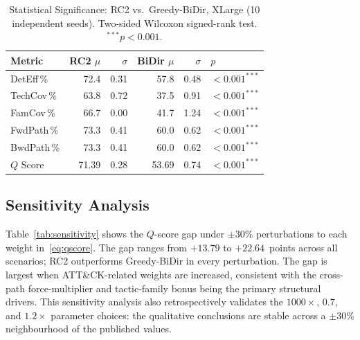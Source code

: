 \documentclass[journal]{IEEEtran}
\newcommand{\qscore}{$Q$-score}
\begin{document}
\begin{table}[t]
\caption{Statistical Significance: RC2 vs.\ Greedy-BiDir, XLarge
  (10 independent seeds). Two-sided Wilcoxon signed-rank test.
  $^{***}p<0.001$.}
\label{tab:stats}
\centering
\renewcommand{\arraystretch}{1.2}
\begin{tabular}{lrrrrl}
\toprule
Metric & RC2 $\mu$ & $\sigma$ & BiDir $\mu$ & $\sigma$ & $p$ \\
\midrule
DetEff\,\%  & 72.4 & 0.31 & 57.8 & 0.48 & $<0.001^{***}$ \\
TechCov\,\% & 63.8 & 0.72 & 37.5 & 0.91 & $<0.001^{***}$ \\
FamCov\,\%  & 66.7 & 0.00 & 41.7 & 1.24 & $<0.001^{***}$ \\
FwdPath\,\% & 73.3 & 0.41 & 60.0 & 0.62 & $<0.001^{***}$ \\
BwdPath\,\% & 73.3 & 0.41 & 60.0 & 0.62 & $<0.001^{***}$ \\
$Q$ Score   & 71.39 & 0.28 & 53.69 & 0.74 & $<0.001^{***}$ \\
\bottomrule
\end{tabular}
\end{table}

\subsection{Sensitivity Analysis}
\label{sec:results:sensitivity}

Table~\ref{tab:sensitivity} shows the \qscore{} gap under $\pm30\%$
perturbations to each weight in~\eqref{eq:qscore}. The gap ranges
from $+13.79$ to $+22.64$~points across all scenarios; RC2
outperforms Greedy-BiDir in every perturbation. The gap is largest
when ATT\&CK-related weights are increased, consistent with the
cross-path force-multiplier and tactic-family bonus being the
primary structural drivers. This sensitivity analysis also
retrospectively validates the $1000\times$, $0.7$, and $1.2\times$
parameter choices: the qualitative conclusions are stable across a
$\pm30\%$ neighbourhood of the published values.
\end{document}
